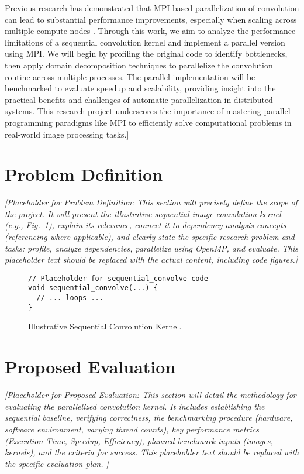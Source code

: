 \documentclass[conference, 10pt]{IEEEtran}
\begin{document}
{{Previous research has demonstrated that MPI-based parallelization of convolution can lead to substantial performance improvements, especially when scaling across multiple compute nodes \cite{farber2011openmp}.
Through this work, we aim to analyze the performance limitations of a sequential convolution kernel and implement a parallel version using MPI. 
We will begin by profiling the original code to identify bottlenecks, 
then apply domain decomposition techniques to parallelize the convolution routine across multiple processes. 
The parallel implementation will be benchmarked to evaluate speedup and scalability, 
providing insight into the practical benefits and challenges of automatic parallelization in distributed systems.
This research project underscores the importance of mastering parallel programming paradigms like MPI to efficiently solve computational problems in real-world image processing tasks.]
}}

\section{Problem Definition}
\textit{{\color{blue} %
[Placeholder for Problem Definition: This section will precisely define the scope of the project. It will present the illustrative sequential image convolution kernel (e.g., Fig.~\ref{fig:seq_code}), explain its relevance, connect it to dependency analysis concepts (referencing \cite{idkfactchecking2025} where applicable), and clearly state the specific research problem and tasks: profile, analyze dependencies, parallelize using OpenMP, and evaluate. This placeholder text should be replaced with the actual content, including code figures.]
}}

\begin{figure}[htbp]
\begin{verbatim}
// Placeholder for sequential_convolve code
void sequential_convolve(...) {
  // ... loops ...
}
\end{verbatim}
\caption{Illustrative Sequential Convolution Kernel.}
\label{fig:seq_code}
\end{figure}


\section{Proposed Evaluation}
\textit{{\color{blue} %
[Placeholder for Proposed Evaluation: This section will detail the methodology for evaluating the parallelized convolution kernel. It includes establishing the sequential baseline, verifying correctness, the benchmarking procedure (hardware, software environment, varying thread counts), key performance metrics (Execution Time, Speedup, Efficiency), planned benchmark inputs (images, kernels), and the criteria for success. This placeholder text should be replaced with the specific evaluation plan.
\cite{hbdscientific2025}]
}}
\end{document}
